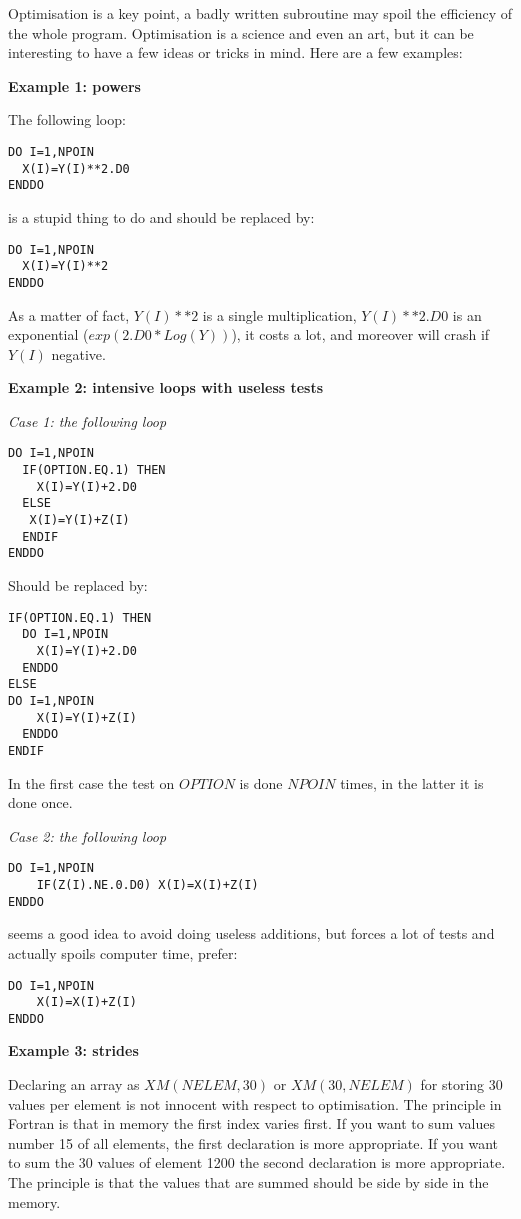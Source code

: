 Optimisation is a key point, a badly written subroutine may spoil the
efficiency of the whole program. Optimisation is a science and even an art, but
it can be interesting to have a few ideas or tricks in mind. Here are a few
examples:

\textbf{Example 1: powers}

The following loop:
\begin{lstlisting}
DO I=1,NPOIN
  X(I)=Y(I)**2.D0
ENDDO
\end{lstlisting}

is a stupid thing to do and should be replaced by:

\begin{lstlisting}
DO I=1,NPOIN
  X(I)=Y(I)**2
ENDDO
\end{lstlisting}

As a matter of fact, $Y(I)**2$ is a single multiplication, $Y(I)**2.D0$ is an
exponential ($exp(2.D0*Log (Y))$), it costs a lot, and moreover will crash if
$Y(I)$ negative.

\textbf{Example 2: intensive loops with useless tests}

\textit{Case 1: the following loop}

\begin{lstlisting}
DO I=1,NPOIN
  IF(OPTION.EQ.1) THEN
    X(I)=Y(I)+2.D0
  ELSE
   X(I)=Y(I)+Z(I)
  ENDIF
ENDDO
\end{lstlisting}

Should be replaced by:

\begin{lstlisting}
IF(OPTION.EQ.1) THEN
  DO I=1,NPOIN
    X(I)=Y(I)+2.D0
  ENDDO
ELSE
DO I=1,NPOIN
    X(I)=Y(I)+Z(I)
  ENDDO
ENDIF
\end{lstlisting}

In the first case the test on $OPTION$ is done $NPOIN$ times, in the latter it is
done once.

\textit{Case 2: the following loop}
\begin{lstlisting}
DO I=1,NPOIN
    IF(Z(I).NE.0.D0) X(I)=X(I)+Z(I)
ENDDO
\end{lstlisting}
seems a good idea to avoid doing useless additions, but forces a lot of tests
and actually spoils computer time, prefer:
\begin{lstlisting}
DO I=1,NPOIN
    X(I)=X(I)+Z(I)
ENDDO
\end{lstlisting}

\textbf{Example 3: strides}

Declaring an array as $XM(NELEM,30)$ or $XM(30,NELEM)$ for storing 30 values per
element is not innocent with respect to optimisation. The principle in Fortran
is that in memory the first index varies first. If you want to sum values
number 15 of all elements, the first declaration is more appropriate. If you
want to sum the 30 values of element 1200 the second declaration is more
appropriate. The principle is that the values that are summed should be side by
side in the memory.

